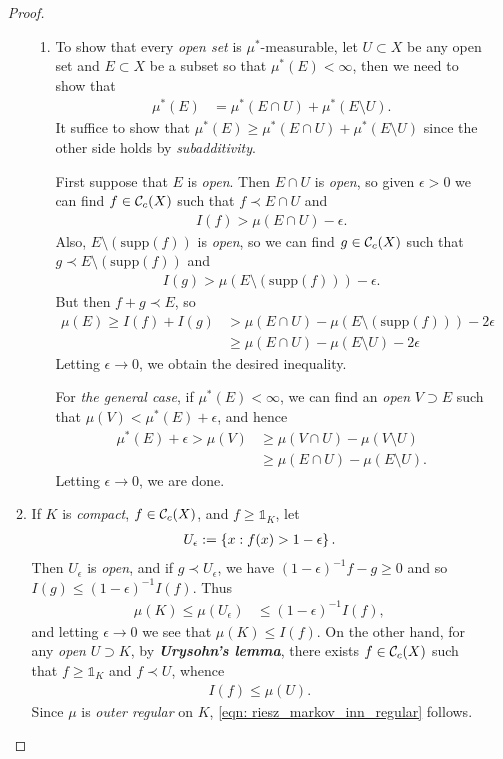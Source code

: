 \documentclass[11pt]{article}
\begin{document}
\begin{itemize}
\begin{proof}
\begin{enumerate}
\begin{enumerate}
\item To show that every \emph{open set} is $\mu^{*}$-measurable, let $U \subset X$ be any open set and $E \subset X$ be a subset so that $\mu^{*}(E) < \infty$, then we need to show that 
\begin{align*}
\mu^{*}(E) &= \mu^{*}(E \cap U) + \mu^{*}(E \setminus U).
\end{align*} It suffice to show that $\mu^{*}(E)  \ge \mu^{*}(E \cap U) + \mu^{*}(E \setminus U)$ since the other side holds by \emph{subadditivity}.

First suppose that $E$ is \emph{open}.
Then $E \cap U$ is \emph{open}, so given $\epsilon > 0$ we can find $f\in  {\mathcal C}_{c}(X)$ such that $f \prec E \cap U$ and
\begin{align*}
I(f) > \mu(E \cap U) - \epsilon.
\end{align*}
Also, $E \setminus (\text{supp}(f))$ is \emph{open}, so we can find $g \in {\mathcal C}_{c}(X)$
such that $g \prec E \setminus (\text{supp}(f))$ and
\begin{align*}
I(g) > \mu(E \setminus (\text{supp}(f))) - \epsilon.
\end{align*} But then $f + g \prec E$, so
\begin{align*}
\mu(E) \ge I(f) + I(g) &> \mu(E \cap U) - \mu(E \setminus (\text{supp}(f))) - 2\epsilon \\
&\ge  \mu(E \cap U) - \mu(E \setminus U)   - 2\epsilon
\end{align*}
Letting $\epsilon \rightarrow 0$, we obtain the desired inequality. 

For \emph{the general case}, if $\mu^{*}(E) < \infty$,
we can find an \emph{open} $V \supset E$ such that $\mu(V) < \mu^{*}(E) + \epsilon$, and hence
\begin{align*}
 \mu^{*}(E) + \epsilon > \mu(V)  &\ge \mu(V \cap U) - \mu(V \setminus U) \\
&\ge  \mu(E \cap U) - \mu(E \setminus U) .
\end{align*}
Letting  $\epsilon \rightarrow 0$, we are done.
\end{enumerate}

\item If $K$ is \emph{compact}, $f\in  {\mathcal C}_{c}(X)$, and $f \ge \mathds{1}_{K}$, let 
\begin{align*}
U_{\epsilon} := \left\{x: f(x) > 1 - \epsilon\right\}.
\end{align*} Then $U_{\epsilon}$ is \emph{open}, and if $g \prec U_{\epsilon}$, we have $(1 - \epsilon)^{-1}f - g \ge 0$ and so $I(g) \le (1-\epsilon)^{-1} I(f)$. Thus
\begin{align*}
\mu(K) \le \mu(U_{\epsilon}) &\le  (1-\epsilon)^{-1} I(f),
\end{align*} and letting $\epsilon \rightarrow 0$ we see that $\mu(K) \le I(f)$. On the other hand, for any \emph{open} $U \supset K$, by \emph{\textbf{Urysohn’s
lemma}}, there exists $f\in  {\mathcal C}_{c}(X)$ such that $f \ge \mathds{1}_{K}$ and $f \prec U$, whence
\begin{align*}
I(f) \le \mu(U).
\end{align*}
Since $\mu$ is \emph{outer regular} on $K$, \eqref{eqn: riesz_markov_inn_regular} follows.


\end{enumerate}
\end{proof}
\end{itemize}
\end{document}
